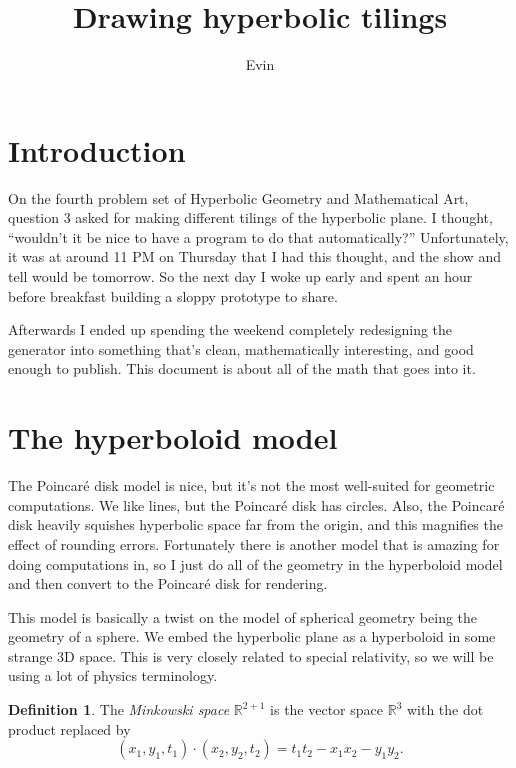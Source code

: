 \documentclass{article}
\title{Drawing hyperbolic tilings}
\author{Evin}
\theoremstyle{definition}
\newtheorem{defn}[thm]{Definition}
\theoremstyle{remark}
\begin{document}
\maketitle

\section{Introduction}
On the fourth problem set of Hyperbolic Geometry and Mathematical Art, question 3 asked for making different tilings of the hyperbolic plane. I thought, ``wouldn't it be nice to have a program to do that automatically?'' Unfortunately, it was at around 11 PM on Thursday that I had this thought, and the show and tell would be tomorrow. So the next day I woke up early and spent an hour before breakfast building a sloppy prototype to share.

Afterwards I ended up spending the weekend completely redesigning the generator into something that's clean, mathematically interesting, and good enough to publish. This document is about all of the math that goes into it.

\section{The hyperboloid model}
The Poincar\'e disk model is nice, but it's not the most well-suited for geometric computations. We like lines, but the Poincar\'e disk has circles. Also, the Poincar\'e disk heavily squishes hyperbolic space far from the origin, and this magnifies the effect of rounding errors. Fortunately there is another model that is amazing for doing computations in, so I just do all of the geometry in the hyperboloid model and then convert to the Poincar\'e disk for rendering.

This model is basically a twist on the model of spherical geometry being the geometry of a sphere. We embed the hyperbolic plane as a hyperboloid in some strange 3D space. This is very closely related to special relativity, so we will be using a lot of physics terminology.
\begin{defn}
    The \emph{Minkowski space} $\mathbb R^{2+1}$ is the vector space $\mathbb R^3$ with the dot product replaced by
    \[(x_1,y_1,t_1)\cdot(x_2,y_2,t_2)=t_1t_2-x_1x_2-y_1y_2.\]
\end{defn}
\end{document}
